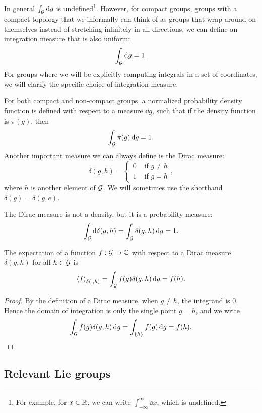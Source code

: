 \documentclass[../../main.tex]{subfiles}
\begin{document}
\begin{refsection}
	In general $\int_{\mathcal{G}} \dd{g}$ is undefined\footnote{
		For example, for $x \in \mathbb{R}$, we can write $\int_{-\infty}^\infty \dd{x}$, which is undefined.
	}.
	However, for compact groups, groups with a compact topology that we informally can think of as groups that wrap around on themselves instead of stretching infinitely in all directions, we can define an integration measure that is also uniform:
	$$\int_{\mathcal{G}} \dd{g} = 1.$$
	For groups where we will be explicitly computing integrals in a set of coordinates, we will clarify the specific choice of integration measure.

	For both compact and non-compact groups, a normalized probability density function is defined with respect to a measure $\dd{g}$, such that if the density function is $\pi(g)$, then
	$$\int_{\mathcal{G}} \pi(g) \dd{g} = 1.$$
	Another important measure we can always define is the Dirac measure:
	\begin{equation}\label{diracdef}
		\delta(g, h) = \begin{cases}
			0 & \text{ if } g \ne h \\
			1 & \text{ if } g = h
		\end{cases},
	\end{equation}
	where $h$ is another element of $\mathcal{G}$.
	We will sometimes use the shorthand $\delta(g) = \delta(g, e)$.

	The Dirac measure is not a density, but it is a probability measure:
	$$\int_{\mathcal{G}} \dd{\delta(g, h)} = \int_{\mathcal{G}} \delta(g, h) \dd{g} = 1.$$
	\begin{theorem}\label{diracexpect}
		The expectation of a function $f: \mathcal{G} \to \mathbb{C}$ with respect to a Dirac measure $\delta(g, h)$ for all $h \in \mathcal{G}$ is
		$$\left\langle f \right\rangle_{\delta(\cdot, h)} = \int_{\mathcal{G}} f(g) \delta(g, h) \dd{g} = f(h).$$
	\end{theorem}
	\begin{proof}
		By the definition of a Dirac measure, when $g \ne h$, the integrand is 0.
		Hence the domain of integration is only the single point $g = h$, and we write
		$$\int_{\mathcal{G}} f(g) \delta(g, h) \dd{g} = \int_{\{h\}} f(g) \dd{g} = f(h).$$
	\end{proof}

	\subsection{Relevant Lie groups}\label{relevant-lie-groups}


\end{refsection}
\end{document}
